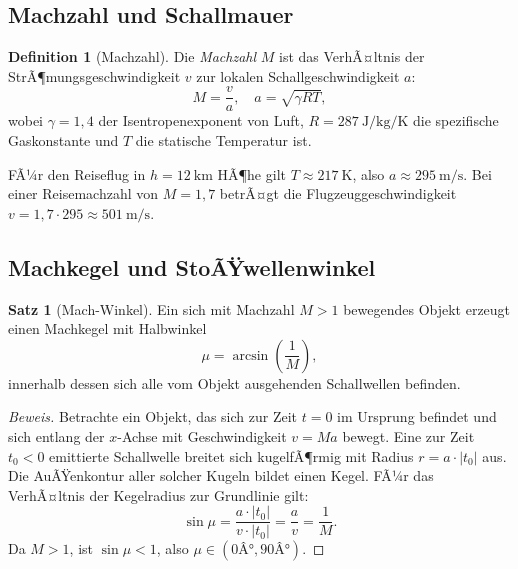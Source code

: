 ﻿\documentclass[12pt,a4paper]{article}
\theoremstyle{definition}
\newtheorem{definition}{Definition}[section]
\newtheorem{satz}{Satz}[section]
\theoremstyle{remark}
\newenvironment{beweis}{\begin{proof}[Beweis]}{\end{proof}}
\begin{document}
\subsection{Machzahl und Schallmauer}

\begin{definition}[Machzahl]
  Die \emph{Machzahl} $M$ ist das VerhÃ¤ltnis der StrÃ¶mungsgeschwindigkeit $v$ zur lokalen
  Schallgeschwindigkeit $a$:
  \begin{equation}
    M = \frac{v}{a}, \quad a = \sqrt{\gamma R T},
    \label{eq:machzahl}
  \end{equation}
  wobei $\gamma = 1{,}4$ der Isentropenexponent von Luft, $R = \SI{287}{\joule\per\kilogram\per\kelvin}$
  die spezifische Gaskonstante und $T$ die statische Temperatur ist.
\end{definition}

FÃ¼r den Reiseflug in $h = \SI{12}{\kilo\meter}$ HÃ¶he gilt $T \approx \SI{217}{\kelvin}$,
also $a \approx \SI{295}{\meter\per\second}$. Bei einer Reisemachzahl von $M = 1{,}7$
betrÃ¤gt die Flugzeuggeschwindigkeit $v = 1{,}7 \cdot 295 \approx \SI{501}{\meter\per\second}$.

\subsection{Machkegel und StoÃŸwellenwinkel}

\begin{satz}[Mach-Winkel]
  \label{satz:mach_winkel}
  Ein sich mit Machzahl $M > 1$ bewegendes Objekt erzeugt einen Machkegel mit Halbwinkel
  \begin{equation}
    \mu = \arcsin\!\left(\frac{1}{M}\right),
    \label{eq:mach_winkel}
  \end{equation}
  innerhalb dessen sich alle vom Objekt ausgehenden Schallwellen befinden.
\end{satz}

\begin{beweis}
  Betrachte ein Objekt, das sich zur Zeit $t = 0$ im Ursprung befindet und sich entlang
  der $x$-Achse mit Geschwindigkeit $v = Ma$ bewegt. Eine zur Zeit $t_0 < 0$ emittierte
  Schallwelle breitet sich kugelfÃ¶rmig mit Radius $r = a \cdot |t_0|$ aus. Die AuÃŸenkontur
  aller solcher Kugeln bildet einen Kegel. FÃ¼r das VerhÃ¤ltnis der Kegelradius zur
  Grundlinie gilt:
  \begin{equation}
    \sin\mu = \frac{a \cdot |t_0|}{v \cdot |t_0|} = \frac{a}{v} = \frac{1}{M}.
  \end{equation}
  Da $M > 1$, ist $\sin\mu < 1$, also $\mu \in (0Â°, 90Â°)$. \qedhere
\end{beweis}
\end{document}
